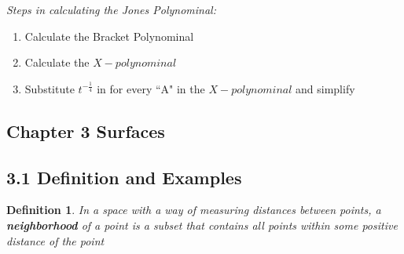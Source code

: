 \documentclass[executivepaper]{article}
\newtheorem{definition}{Definition}
\begin{document}
\pagebreak

\vspace*{-30mm}

\begin{tcolorbox}

\textit{Steps in calculating the Jones Polynominal:}

\begin{center}

\begin{enumerate}

\item Calculate the Bracket Polynominal

\item Calculate the $X-polynominal$

\item Substitute $t^{-\frac{1}{4}}$ in for every ``A" in the $X-polynominal$ and simplify

\end{enumerate}

\end{center}

\end{tcolorbox}

\begin{center}

\section*{Chapter 3 Surfaces}

\end{center}

\subsection*{3.1 Definition and Examples}

\begin{tcolorbox}

\begin{definition}

\textit{In a space with a way of measuring distances between points, a \textbf{neighborhood} of a point is a subset that contains all points within some positive distance of the point}

\end{definition}

\end{tcolorbox}

\vspace{2mm}
\end{document}
